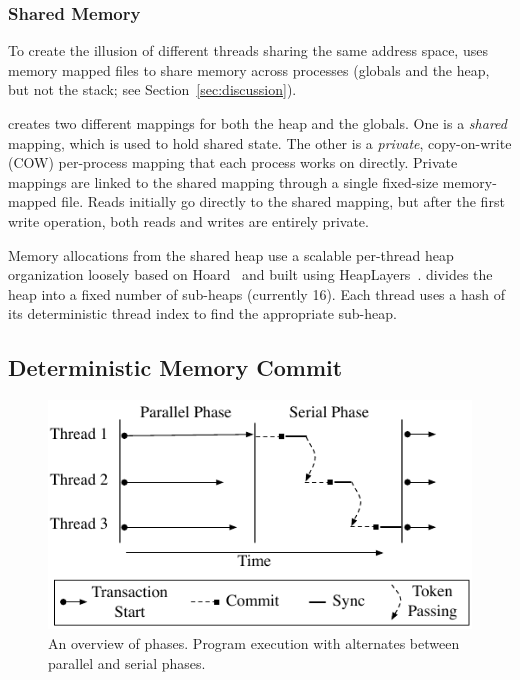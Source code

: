 \subsubsection{Shared Memory}
\label{sec:stackandheap}

To create the illusion of different threads sharing the same
address space, \dthreads{} uses memory mapped files to share memory
across processes (globals and the heap, but not the stack; see
Section~\ref{sec:discussion}).

\dthreads{} creates two different mappings for both the heap and the
globals.  One is a \emph{shared} mapping, which is used to hold shared state.
The other is a \emph{private}, copy-on-write (COW) per-process mapping that
each process works on directly.  Private mappings are linked to the
shared mapping through a single fixed-size memory-mapped file.
Reads initially go directly to the shared mapping,
but after the first write operation,
both reads and writes are entirely private.

Memory allocations from the shared heap use a scalable
per-thread heap organization loosely based on
Hoard~\cite{BergerMcKinleyBlumofeWilson:ASPLOS2000} and built using
HeapLayers~\cite{BergerZornMcKinley:2001}.  \dthreads{} divides the
heap into a fixed number of sub-heaps (currently 16).  Each thread
uses a hash of its deterministic thread index to find the appropriate sub-heap.

\subsection{Deterministic Memory Commit}
\label{sec:sharedmem}

\begin{figure}[b]
{\centering 
\includegraphics{fig/phase-diagram}
\caption{An overview of \dthreads{} phases. Program execution with \dthreads{} alternates between parallel and serial phases.\label{fig:phase}}
}
\end{figure}

